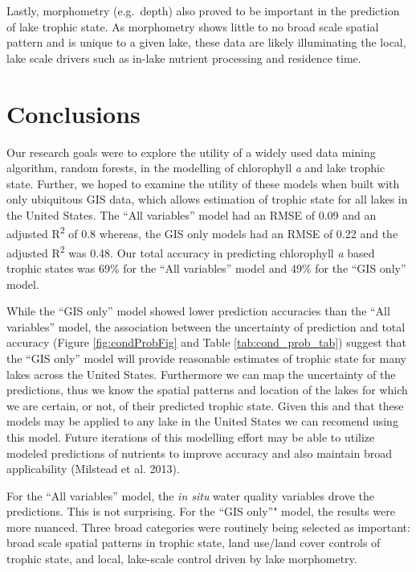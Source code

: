 \documentclass[11pt,]{article}
\begin{document}
Lastly, morphometry (e.g.~depth) also proved to be important in the
prediction of lake trophic state. As morphometry shows little to no
broad scale spatial pattern and is unique to a given lake, these data
are likely illuminating the local, lake scale drivers such as in-lake
nutrient processing and residence time.

\section{Conclusions}\label{conclusions}

Our research goals were to explore the utility of a widely used data
mining algorithm, random forests, in the modelling of chlorophyll
\emph{a} and lake trophic state. Further, we hoped to examine the
utility of these models when built with only ubiquitous GIS data, which
allows estimation of trophic state for all lakes in the United States.
The ``All variables'' model had an RMSE of 0.09 and an adjusted
R\textsuperscript{2} of 0.8 whereas, the GIS only models had an RMSE of
0.22 and the adjusted R\textsuperscript{2} was 0.48. Our total accuracy
in predicting chlorophyll \emph{a} based trophic states was 69\% for the
``All variables'' model and 49\% for the ``GIS only'' model.

While the ``GIS only'' model showed lower prediction accuracies than the
``All variables'' model, the association between the uncertainty of
prediction and total accuracy (Figure \ref{fig:condProbFig} and Table
\ref{tab:cond_prob_tab}) suggest that the ``GIS only'' model will
provide reasonable estimates of trophic state for many lakes across the
United States. Furthermore we can map the uncertainty of the
predictions, thus we know the spatial patterns and location of the lakes
for which we are certain, or not, of their predicted trophic state.
Given this and that these models may be applied to any lake in the
United States we can recomend using this model. Future iterations of
this modelling effort may be able to utilize modeled predictions of
nutrients to improve accuracy and also maintain broad applicability
(Milstead et al. 2013).

For the ``All variables'' model, the \emph{in situ} water quality
variables drove the predictions. This is not surprising. For the ``GIS
only''" model, the results were more nuanced. Three broad categories
were routinely being selected as important: broad scale spatial patterns
in trophic state, land use/land cover controls of trophic state, and
local, lake-scale control driven by lake morphometry.
\end{document}
